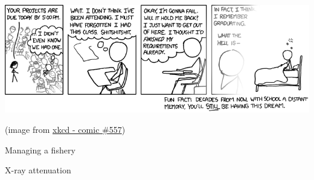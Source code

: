 %
%


\begin{topic}[Projects]


\vfil

\begin{center}
\begin{minipage}{450pt}
	\includegraphics*[width=450pt]{images/chap6-xkcd.png}

	\hfill {\footnotesize (image from \href{https://www.xkcd.com/557/}{xkcd - comic \#557})}
\end{minipage}
\end{center}
\end{topic}











%
%



\begin{project}{Managing a fishery}
	\label{proj:fishery}

	
\end{project}









%
%



\begin{project}{X-ray attenuation}
	\label{proj:xray}

	
\end{project}










